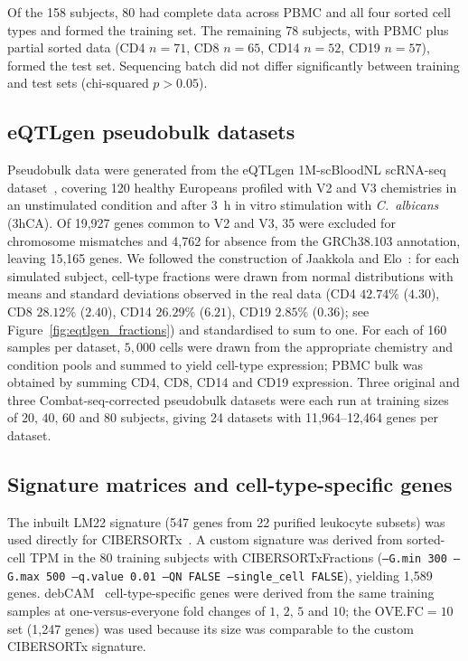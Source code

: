 \documentclass[11pt]{article}
\begin{document}
Of the 158 subjects, 80 had complete data across PBMC and all four
sorted cell types and formed the training set. The remaining 78
subjects, with PBMC plus partial sorted data (CD4 $n = 71$, CD8
$n = 65$, CD14 $n = 52$, CD19 $n = 57$), formed the test set. Sequencing
batch did not differ significantly between training and test sets
(chi-squared $p > 0.05$).

\subsection{eQTLgen pseudobulk datasets}

Pseudobulk data were generated from the eQTLgen 1M-scBloodNL
scRNA-seq dataset~\citep{oelen2022singlecell}, covering 120 healthy
Europeans profiled with V2 and V3 chemistries in an unstimulated
condition and after 3~h in vitro stimulation with \emph{C.~albicans}
(3hCA). Of 19{,}927 genes common to V2 and V3, 35 were excluded for
chromosome mismatches and 4{,}762 for absence from the GRCh38.103
annotation, leaving 15{,}165 genes. We followed the construction of
Jaakkola and Elo~\citep{jaakkola2017comparison}: for each simulated
subject, cell-type fractions were drawn from normal distributions with
means and standard deviations observed in the real data
(CD4 $42.74\%$ ($4.30$), CD8 $28.12\%$ ($2.40$), CD14 $26.29\%$
($6.21$), CD19 $2.85\%$ ($0.36$); see Figure~\ref{fig:eqtlgen_fractions})
and standardised to sum to one. For each of 160 samples per dataset,
$5{,}000$ cells were drawn from the appropriate chemistry and
condition pools and summed to yield cell-type expression; PBMC bulk
was obtained by summing CD4, CD8, CD14 and CD19 expression. Three
original and three Combat-seq-corrected pseudobulk datasets were each
run at training sizes of $20$, $40$, $60$ and $80$ subjects, giving 24
datasets with 11{,}964--12{,}464 genes per dataset.

\subsection{Signature matrices and cell-type-specific genes}

The inbuilt LM22 signature (547 genes from 22 purified leukocyte
subsets) was used directly for CIBERSORTx~\citep{newman2015robust}. A
custom signature was derived from sorted-cell TPM in the 80 training
subjects with CIBERSORTxFractions (\texttt{--G.min 300 --G.max 500
--q.value 0.01 --QN FALSE --single\_cell FALSE}), yielding 1{,}589
genes. debCAM~\citep{chen2020debcam} cell-type-specific genes were
derived from the same training samples at one-versus-everyone fold
changes of $1$, $2$, $5$ and $10$; the $\mathrm{OVE.FC}=10$ set
(1{,}247 genes) was used because its size was comparable to the
custom CIBERSORTx signature.
\end{document}
